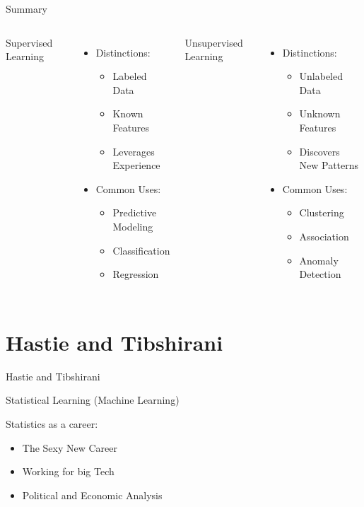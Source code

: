 \documentclass{beamer}
\begin{document}
\begin{frame}{Summary}
	\begin{columns}
		Supervised Learning
		\begin{itemize}
			\item[] Distinctions:
			\begin{itemize}
				\item Labeled Data
				\item Known Features
				\item Leverages Experience
			\end{itemize}
			\item[] Common Uses:
			\begin{itemize}
				\item Predictive Modeling
				\item Classification
				\item Regression
			\end{itemize}
		\end{itemize}
		Unsupervised Learning
		\begin{itemize}
			\item[] Distinctions:
			\begin{itemize}
				\item Unlabeled Data
				\item Unknown Features
				\item Discovers New Patterns
			\end{itemize}
			\item[] Common Uses:
			\begin{itemize}
				\item Clustering
				\item Association
				\item Anomaly Detection
			\end{itemize}
		\end{itemize}
	\end{columns}
\end{frame}

\section{Hastie and Tibshirani}

\begin{frame}{Hastie and Tibshirani}

Statistical Learning (Machine Learning)

Statistics as a career:\\
\begin{itemize}
	\item The Sexy New Career
	\item Working for big Tech
	\item Political and Economic Analysis
\end{itemize}
 \\

\end{frame}
\end{document}
